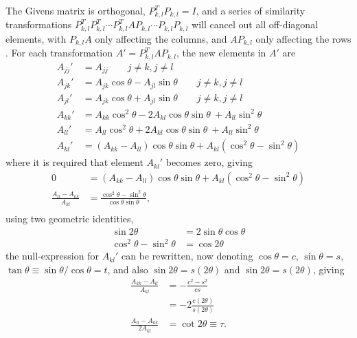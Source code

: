 \documentclass[a4paper,11pt]{article}
\begin{document}
The Givens matrix is orthogonal, $P_{k,l}^T P_{k,l} = I$, and a series of similarity transformations $P_{k,l}^T P_{k,l}^T \cdots P_{k,l}^T A P_{k,l} \cdots P_{k,l}  P_{k,l}$ will cancel out all off-diagonal elements, with $P_{k,l} A$ only affecting the columns, and $A P_{k,l}$ only affecting the rows \cite{numrecipes}. For each transformation $A' = P_{k,l}^T A P_{k,l} $, the new elements in $A'$ are
\begin{align*}
    A_{jj}' &= A_{jj}   \qquad j\neq k, j \neq l \\
    A_{jk}' &= A_{jk} \cos \theta - A_{jl} \sin\theta   \qquad j\neq k, j \neq l \\
    A_{jl}' &= A_{jk} \cos \theta + A_{jl} \sin\theta   \qquad j\neq k, j \neq l \\
    A_{kk}' &= A_{kk} \cos^2\theta - 2 A_{kl} \cos\theta \sin\theta 
                    ~+ A_{ll} \sin^2\theta \\
    A_{ll}' &= A_{ll} \cos^2\theta + 2 A_{kl} \cos\theta \sin\theta 
                    ~+ A_{ll} \sin^2\theta \\
    A_{kl}' &= \left( A_{kk} - A_{ll} \right) \cos\theta \sin\theta 
                + A_{kl} \left( \cos^2\theta -\sin^2\theta \right)
\end{align*}
where it is required that element $A_{kl}'$ becomes zero, giving
\begin{align*}
    0   &= \left( A_{kk} - A_{ll} \right) \cos\theta \sin\theta 
                + A_{kl} \left( \cos^2\theta -\sin^2\theta \right) \\
    \frac{A_{ll} - A_{kk}}{A_{kl}} &= \frac{\cos^2\theta - \sin^2\theta}{\cos\theta \sin\theta}, \\
\end{align*}
using two geometric identities,
\begin{align*}
    \sin 2\theta &= 2\sin\theta \cos\theta \\
    \cos^2\theta - \sin^2 \theta &= \cos 2\theta 
\end{align*}
the null-expression for $A_{kl}'$ can be rewritten, now denoting $\cos\theta = c$, $\sin\theta  = s$, $\tan \theta \equiv \sin\theta/\cos\theta = t$, and also $\sin 2\theta = s(2\theta)$ and $\sin 2\theta = s\left( 2\theta \right)$, giving
\begin{align*}
    \frac{A_{kk} - A_{ll}}{A_{kl}} &= - \frac{c^2 - s^2}{cs} \\
    &= -2 \frac{c\left( 2\theta \right)}{s\left( 2\theta \right)} \\
    \frac{A_{ll} - A_{kk}}{2A_{kl}} &= \cot 2\theta \equiv \tau.
\end{align*}
\end{document}
